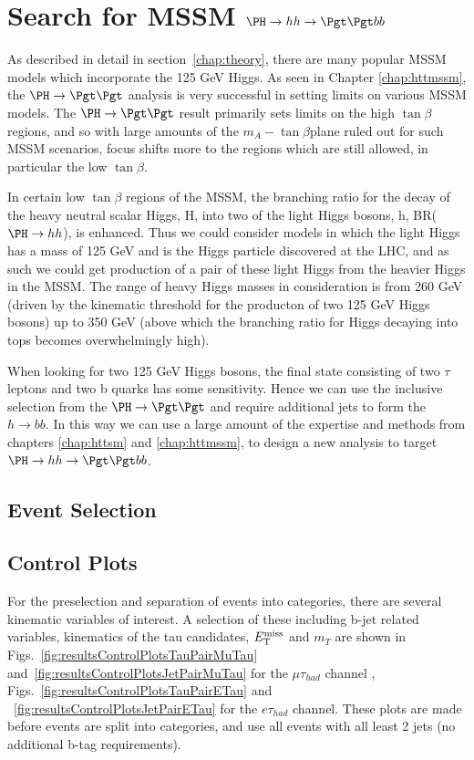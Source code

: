 \chapter{Search for MSSM $\PH \to hh \to \Pgt\Pgt bb$}
\label{chap:Hhh}

As described in detail in section~\ref{chap:theory}, there are many popular MSSM
models which incorporate the 125 GeV Higgs. As seen in Chapter
\ref{chap:httmssm}, the $\PH \to \Pgt\Pgt$ analysis is very successful in 
setting limits on various MSSM models. The $\PH \to \Pgt \Pgt$ result primarily sets
limits on the high $\tan\beta$ regions, and so with large amounts of the
$m_{A}-\tan\beta$plane ruled out for such MSSM scenarios, focus shifts more 
to the regions which are still allowed, in particular the low $\tan\beta$.

In certain low $\tan\beta$ regions of the MSSM, the branching ratio for the
decay of the heavy neutral scalar Higgs, H, into two of the light Higgs bosons, h,
BR($\PH \to hh$), is enhanced. Thus we could consider models in which the
light Higgs has a mass of 125 GeV and is the Higgs particle discovered at the
LHC, and as such we could get production of a pair of these light Higgs from the
heavier Higgs in the MSSM. The range of heavy Higgs masses in consideration is from 260 GeV
(driven by the kinematic threshold for the producton of two 125 GeV Higgs
bosons) up to 350 GeV (above which the branching ratio for Higgs decaying into
tops becomes overwhelmingly high).

When looking for two 125 GeV Higgs bosons, the final state consisting of two
$\tau$ leptons and two b quarks has some sensitivity. Hence we can use the
inclusive selection from the $\PH \to \Pgt\Pgt$ and require additional jets
to form the $h \to bb$. In this way we can use a large amount of the
expertise and methods from chapters \ref{chap:httsm} and \ref{chap:httmssm}, 
to design a new analysis to target $\PH \to hh \to \Pgt\Pgt bb$.

\section{Event Selection}

\section{Control Plots}

For the preselection and separation of events into categories, there are several
kinematic variables of interest. A selection of these including b-jet related
variables, kinematics of the tau candidates, $E_{\mathrm{T}}^{\text{miss}}$ and $m_{T}$ are shown in
Figs.~\ref{fig:resultsControlPlotsTauPairMuTau}
and~\ref{fig:resultsControlPlotsJetPairMuTau} for the $\mu\tau_{had}$ channel
, Figs.~\ref{fig:resultsControlPlotsTauPairETau} and
~\ref{fig:resultsControlPlotsJetPairETau} for the $e\tau_{had}$ channel.
These plots are made before events are split into categories, and use all events
with all least 2 jets (no additional b-tag requirements).


